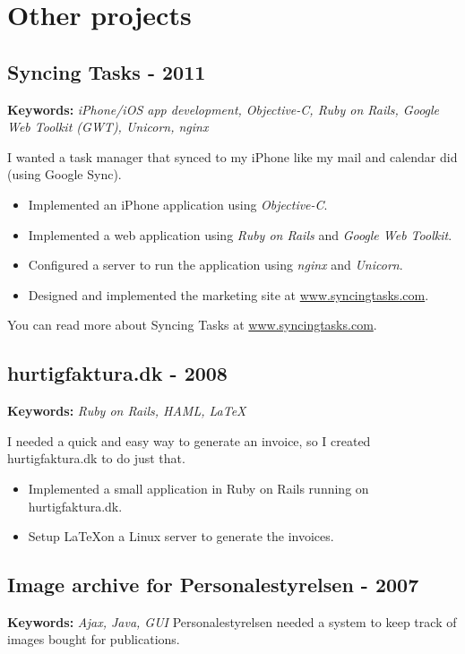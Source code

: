 \documentclass[a4paper]{article}
\newcommand{\keywords}[1]{\small\textbf{Keywords:} \emph{#1}\normalsize}
\begin{document}
\section*{Other projects}

\subsection*{Syncing Tasks - 2011}
\keywords{iPhone/iOS app development, Objective-C, Ruby on Rails, Google Web Toolkit (GWT), Unicorn, nginx}

I wanted a task manager that synced to my iPhone like my mail and calendar did (using Google Sync).

\begin{itemize}
\item Implemented an iPhone application using \emph{Objective-C}.
\item Implemented a web application using \emph{Ruby on Rails} and \emph{Google Web Toolkit}.
\item Configured a server to run the application using \emph{nginx} and \emph{Unicorn}.
\item Designed and implemented the marketing site at \href{http://www.syncingtasks.com}{www.syncingtasks.com}.
\end{itemize}

You can read more about Syncing Tasks at \href{http://www.syncingtasks.com}{www.syncingtasks.com}.
\subsection*{hurtigfaktura.dk - 2008}
\keywords{Ruby on Rails, HAML, \LaTeX}

I needed a quick and easy way to generate an invoice, so I created hurtigfaktura.dk to do just that.

\begin{itemize}
	\item Implemented a small application in Ruby on Rails running on hurtigfaktura.dk.
	\item Setup \LaTeX on a Linux server to generate the invoices.
\end{itemize}

\subsection*{Image archive for Personalestyrelsen - 2007} 
\keywords{Ajax, Java, GUI}
Personalestyrelsen needed a system to keep track of images bought for publications.
\end{document}
